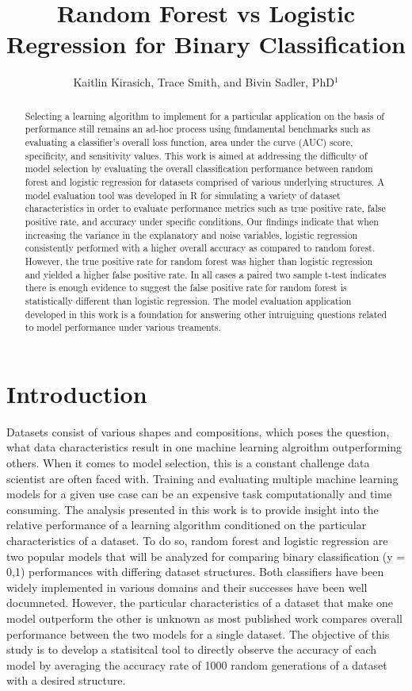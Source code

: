 \documentclass{llncs}
\title{\textbf{Random Forest vs Logistic Regression for Binary Classification}}
\author{Kaitlin Kirasich, Trace Smith, and Bivin Sadler, PhD$^1$}
\institute{$^1$Master of Science in Data Science \\ Southern Methodist University \\ Dallas, Texas USA \\
\email{kkirasich@.smu.edu,traces@smu.edu,bsadler@smu.edu}}
\begin{document}
\maketitle

\begin{abstract} 
Selecting a learning algorithm to implement for a particular application on the basis of performance still remains an ad-hoc process using fundamental benchmarks such as evaluating a classifier’s overall loss function, area under the curve (AUC) score, specificity, and sensitivity values. This work is aimed at addressing the difficulty of model selection by evaluating the overall classification performance between random forest and logistic regression for datasets comprised of various underlying structures. A model evaluation tool was developed in R for simulating a variety of dataset characteristics in order to evaluate performance metrics such as true positive rate, false positive rate, and accuracy under specific conditions. Our findings indicate that when increasing the variance in the explanatory and noise variables, logistic regression consistently performed with a higher overall accuracy as compared to random forest.  However, the true positive rate for random forest was higher than logistic regression and yielded a higher false positive rate. In all cases a paired two sample t-test indicates there is enough evidence to suggest the false positive rate for random forest is statistically different than logistic regression. The model evaluation application developed in this work is a foundation for answering other intruiguing questions related to model performance under various treaments. 

\end{abstract}


\section{Introduction}

Datasets consist of various shapes and compositions, which poses the question, what data characteristics result in one machine learning algroithm outperforming others. When it comes to model selection, this is a constant challenge data scientist are often faced with. Training and evaluating multiple machine learning models for a given use case can be an expensive task computationally and time consuming. The analysis presented in this work is to provide insight into the relative performance of a learning algorithm conditioned on the particular characteristics of a dataset. To do so, random forest and logistic regression are two popular models that will be analyzed for comparing binary classification (y = {0,1}) performances with differing dataset structures. Both classifiers have been widely implemented in various domains and their successes have been well documneted. However, the particular characteristics of a dataset that make one model outperform the other is unknown as most published work compares overall performance between the two models for a single dataset. The objective of this study is to develop a statisitcal tool to directly observe the accuracy of each model by averaging the accuracy rate of 1000 random generations of a dataset with a desired structure.
\end{document}
